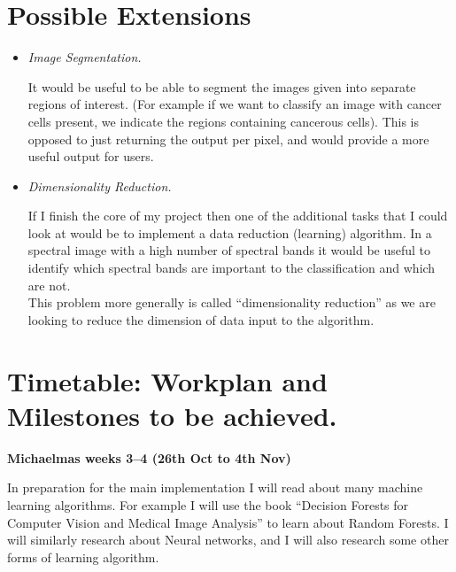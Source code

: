 \section*{Possible Extensions}

\begin{itemize}

    \item
    {\em Image Segmentation.}

    It would be useful to be able to segment the images given into separate 
    regions of interest. (For example if we want to classify an image with 
    cancer cells present, we indicate the regions containing cancerous cells).
    This is opposed to just returning the output per pixel, and would provide 
    a more useful output for users.

    \item 
    {\em Dimensionality Reduction.}

    If I finish the core of my project then one of the additional tasks that I 
    could look at would be to implement a data reduction (learning) algorithm. 
    In a spectral image with a high number of spectral bands it would be useful 
    to identify which spectral bands are important to the classification and 
    which are not. \\

    This problem more generally is called ``dimensionality reduction'' as we are 
    looking to reduce the dimension of data input to the algorithm.

\end{itemize}



\clearpage
\section*{Timetable: Workplan and Milestones to be achieved.}

{\bf Michaelmas weeks 3--4 (26th Oct to 4th Nov)} 

In preparation for the main implementation I will read about many machine 
learning algorithms. For example I will use the book ``Decision Forests for 
Computer Vision and Medical Image Analysis'' to learn about Random Forests. I 
will similarly research about Neural networks, and I will also research some 
other forms of learning algorithm. \\

